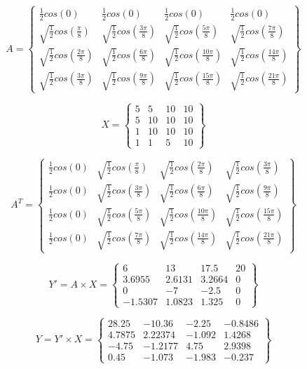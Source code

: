 \documentclass[titlepage]{article}
\begin{document}
$$A = \begin{Bmatrix}
      \frac{1}{2}cos(0) & \frac{1}{2}cos(0) & \frac{1}{2}cos(0) & \frac{1}{2}cos(0) \\
     \sqrt{\frac{1}{2}}cos(\frac{\pi}{8}) & \sqrt{\frac{1}{2}}cos(\frac{3\pi}{8}) & \sqrt{\frac{1}{2}}cos(\frac{5\pi}{8}) & \sqrt{\frac{1}{2}}cos(\frac{7\pi}{8}) \\
      \sqrt{\frac{1}{2}}cos(\frac{2\pi}{8}) & \sqrt{\frac{1}{2}}cos(\frac{6\pi}{8}) & \sqrt{\frac{1}{2}}cos(\frac{10\pi}{8}) & \sqrt{\frac{1}{2}}cos(\frac{14\pi}{8}) \\
      \sqrt{\frac{1}{2}}cos(\frac{3\pi}{8}) & \sqrt{\frac{1}{2}}cos(\frac{9\pi}{8}) & \sqrt{\frac{1}{2}}cos(\frac{15\pi}{8}) & \sqrt{\frac{1}{2}}cos(\frac{21\pi}{8})
   \end{Bmatrix}$$

$$X =\begin{Bmatrix}
      5 & 5 & 10 & 10 \\
      5 & 10 & 10 & 10 \\
      1 & 10 & 10 & 10 \\
      1 & 1 & 5 & 10
   \end{Bmatrix}$$

$$A^T = \begin{Bmatrix}
      \frac{1}{2}cos(0) &  \sqrt{\frac{1}{2}}cos(\frac{\pi}{8})& \sqrt{\frac{1}{2}}cos(\frac{2\pi}{8}) &  \sqrt{\frac{1}{2}}cos(\frac{3\pi}{8})\\
      \frac{1}{2}cos(0)& \sqrt{\frac{1}{2}}cos(\frac{3\pi}{8}) & \sqrt{\frac{1}{2}}cos(\frac{6\pi}{8})  & \sqrt{\frac{1}{2}}cos(\frac{9\pi}{8}) \\
       \frac{1}{2}cos(0)&  \sqrt{\frac{1}{2}}cos(\frac{5\pi}{8})& \sqrt{\frac{1}{2}}cos(\frac{10\pi}{8}) & \sqrt{\frac{1}{2}}cos(\frac{15\pi}{8})  \\
       \frac{1}{2}cos(0)&  \sqrt{\frac{1}{2}}cos(\frac{7\pi}{8})& \sqrt{\frac{1}{2}}cos(\frac{14\pi}{8})& \sqrt{\frac{1}{2}}cos(\frac{21\pi}{8})
   \end{Bmatrix}$$

$$Y' = A \times X  =\begin{Bmatrix}
      6 & 13 & 17.5 & 20 \\
      3.6955 & 2.6131 & 3.2664 & 0 \\
      0 & -7 & -2.5 & 0 \\
      -1.5307 & 1.0823 & 1.325 & 0
   \end{Bmatrix}$$


$$Y = Y' \times X  =\begin{Bmatrix}
      28.25 & -10.36 & -2.25 & -0.8486 \\
      4.7875 & 2.22374 & -1.092 & 1.4268 \\
      -4.75 & -1.2177 & 4.75 & 2.9398 \\
      0.45 & -1.073 & -1.983 & -0.237
   \end{Bmatrix}$$
\end{document}
